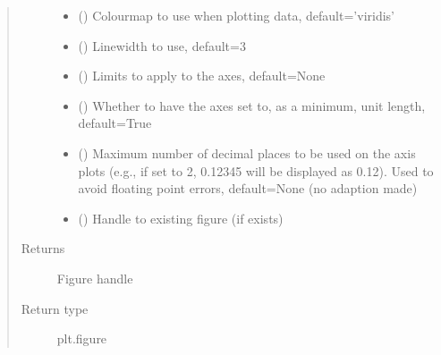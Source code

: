 \documentclass[letterpaper,10pt,english]{sphinxmanual}
\begin{document}
\begin{fulllineitems}
\begin{quote}
\begin{description}
\begin{itemize}
\item {} 
\sphinxAtStartPar
{} (\sphinxstyleliteralemphasis{\sphinxupquote{, }}) \textendash{} Colourmap to use when plotting data, default=’viridis’

\item {} 
\sphinxAtStartPar
{} (\sphinxstyleliteralemphasis{\sphinxupquote{, }}) \textendash{} Linewidth to use, default=3

\item {} 
\sphinxAtStartPar
{} (\sphinxstyleliteralemphasis{\sphinxupquote{, }}) \textendash{} Limits to apply to the axes, default=None

\item {} 
\sphinxAtStartPar
{} (\sphinxstyleliteralemphasis{\sphinxupquote{, }}) \textendash{} Whether to have the axes set to, as a minimum, unit length, default=True

\item {} 
\sphinxAtStartPar
{} (\sphinxstyleliteralemphasis{\sphinxupquote{, }}) \textendash{} Maximum number of decimal places to be used on the axis plots (e.g., if set to 2, 0.12345 will be displayed
as 0.12). Used to avoid floating point errors, default=None (no adaption made)

\item {} 
\sphinxAtStartPar
{} (\sphinxstyleliteralemphasis{\sphinxupquote{, }}) \textendash{} Handle to existing figure (if exists)

\end{itemize}

\item[{Returns}] \leavevmode
\sphinxAtStartPar
{} \textendash{} Figure handle

\item[{Return type}] \leavevmode
\sphinxAtStartPar
plt.figure

\end{description}\end{quote}

\end{fulllineitems}
\end{document}
